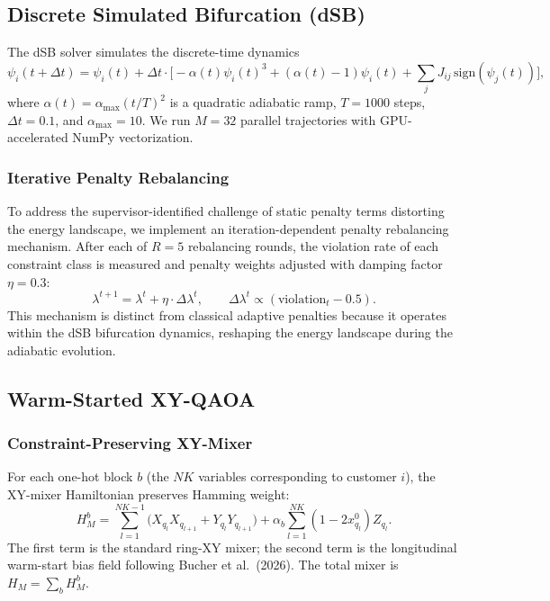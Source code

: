 \documentclass[11pt,a4paper]{article}
\theoremstyle{definition}
\begin{document}
\subsection{Discrete Simulated Bifurcation (dSB)}

The dSB solver simulates the discrete-time dynamics
\begin{equation}\label{eq:dsb}
    \psi_i(t+\Delta t) = \psi_i(t) + \Delta t \cdot \big[ -\alpha(t)\psi_i(t)^3 + (\alpha(t)-1)\psi_i(t) + \sum_j J_{ij}\,\text{sign}(\psi_j(t)) \big],
\end{equation}
where $\alpha(t) = \alpha_{\max}(t/T)^2$ is a quadratic adiabatic ramp, $T=1000$ steps, $\Delta t = 0.1$, and $\alpha_{\max}=10$. We run $M=32$ parallel trajectories with GPU-accelerated NumPy vectorization.

\subsubsection{Iterative Penalty Rebalancing}

To address the supervisor-identified challenge of static penalty terms distorting the energy landscape, we implement an iteration-dependent penalty rebalancing mechanism. After each of $R=5$ rebalancing rounds, the violation rate of each constraint class is measured and penalty weights adjusted with damping factor $\eta=0.3$:
\begin{equation}
    \lambda^{t+1} = \lambda^t + \eta \cdot \Delta\lambda^t, \qquad \Delta\lambda^t \propto (\text{violation}_t - 0.5).
\end{equation}
This mechanism is distinct from classical adaptive penalties because it operates within the dSB bifurcation dynamics, reshaping the energy landscape during the adiabatic evolution.

\subsection{Warm-Started XY-QAOA}

\subsubsection{Constraint-Preserving XY-Mixer}

For each one-hot block $b$ (the $NK$ variables corresponding to customer $i$), the XY-mixer Hamiltonian preserves Hamming weight:
\begin{equation}
    H_M^b = \sum_{l=1}^{NK-1} \big( X_{q_l} X_{q_{l+1}} + Y_{q_l} Y_{q_{l+1}} \big) + \alpha_b \sum_{l=1}^{NK} (1-2x_{q_l}^0) Z_{q_l}.
\end{equation}
The first term is the standard ring-XY mixer; the second term is the longitudinal warm-start bias field following Bucher et al.\ (2026). The total mixer is $H_M = \sum_b H_M^b$.
\end{document}
